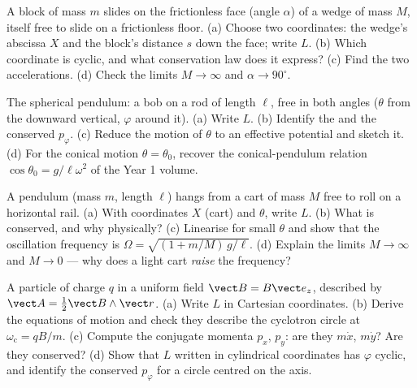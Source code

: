 \begin{exercise}[$\star\star$]\label{exo:b3:lagrangian-mechanics:5}
A block of mass $m$ slides on the frictionless face (angle $\alpha$) of
a wedge of mass $M$, itself free to slide on a frictionless floor. (a)
Choose two coordinates: the wedge's abscissa $X$ and the block's
distance $s$ down the face; write $L$. (b) Which coordinate is cyclic,
and what conservation law does it express? (c) Find the two
accelerations. (d) Check the limits $M \to \infty$ and $\alpha \to
90^\circ$.
\end{exercise}

\begin{exercise}[$\star\star$]\label{exo:b3:lagrangian-mechanics:6}
The spherical pendulum: a bob on a rod of length $\ell$, free in both
angles ($\theta$ from the downward vertical, $\varphi$ around it). (a)
Write $L$. (b) Identify the  and the conserved
$p_\varphi$. (c) Reduce the motion of $\theta$ to an effective
potential and sketch it. (d) For the conical motion $\theta =
\theta_0$, recover the conical-pendulum relation $\cos\theta_0 =
g/\ell\omega^2$ of the Year 1 volume.
\end{exercise}

\begin{exercise}[$\star\star$]\label{exo:b3:lagrangian-mechanics:7}
A pendulum (mass $m$, length $\ell$) hangs from a cart of mass $M$ free
to roll on a horizontal rail. (a) With coordinates $X$ (cart) and
$\theta$, write $L$. (b) What is conserved, and why physically? (c)
Linearise for small $\theta$ and show that the oscillation frequency is
$\Omega = \sqrt{(1 + m/M)\,g/\ell}$. (d) Explain the limits $M \to
\infty$ and $M \to 0$ --- why does a light cart \emph{raise} the
frequency?
\end{exercise}

\begin{exercise}[$\star\star$]\label{exo:b3:lagrangian-mechanics:8}
A particle of charge $q$ in a uniform field $\vect B = B\vect e_z$,
described by $\vect A = \tfrac12\vect B\wedge\vect r$. (a) Write $L$ in
Cartesian coordinates. (b) Derive the equations of motion and check
they describe the cyclotron circle at $\omega_{\text{c}} = qB/m$. (c)
Compute the conjugate momenta $p_x$, $p_y$: are they $m\dot x$,
$m\dot y$? Are they conserved? (d) Show that $L$ written in cylindrical
coordinates has $\varphi$ cyclic, and identify the conserved
$p_\varphi$ for a circle centred on the axis.
\end{exercise}

